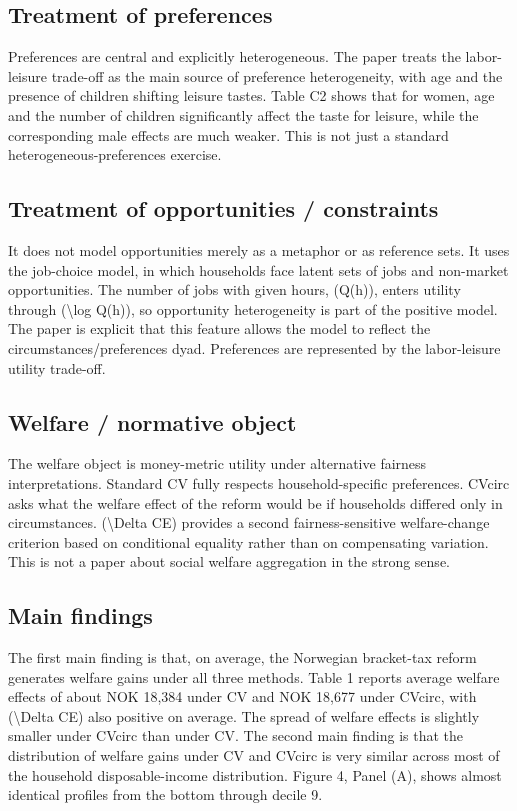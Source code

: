 \documentclass[11pt,a4paper]{article}
\begin{document}
\subsection*{Treatment of preferences}
Preferences are central and explicitly heterogeneous. The paper treats the labor-leisure trade-off as the main source of preference heterogeneity, with age and the presence of children shifting leisure tastes. Table C2 shows that for women, age and the number of children significantly affect the taste for leisure, while the corresponding male effects are much weaker. This is not just a standard heterogeneous-preferences exercise.

\subsection*{Treatment of opportunities / constraints}
It does not model opportunities merely as a metaphor or as reference sets. It uses the job-choice model, in which households face latent sets of jobs and non-market opportunities. The number of jobs with given hours, (Q(h)), enters utility through (\textbackslash{}log Q(h)), so opportunity heterogeneity is part of the positive model. The paper is explicit that this feature allows the model to reflect the circumstances/preferences dyad. Preferences are represented by the labor-leisure utility trade-off.

\subsection*{Welfare / normative object}
The welfare object is money-metric utility under alternative fairness interpretations. Standard CV fully respects household-specific preferences. CVcirc asks what the welfare effect of the reform would be if households differed only in circumstances. (\textbackslash{}Delta CE) provides a second fairness-sensitive welfare-change criterion based on conditional equality rather than on compensating variation. This is not a paper about social welfare aggregation in the strong sense.

\subsection*{Main findings}
The first main finding is that, on average, the Norwegian bracket-tax reform generates welfare gains under all three methods. Table 1 reports average welfare effects of about NOK 18,384 under CV and NOK 18,677 under CVcirc, with (\textbackslash{}Delta CE) also positive on average. The spread of welfare effects is slightly smaller under CVcirc than under CV. The second main finding is that the distribution of welfare gains under CV and CVcirc is very similar across most of the household disposable-income distribution. Figure 4, Panel (A), shows almost identical profiles from the bottom through decile 9.
\end{document}
